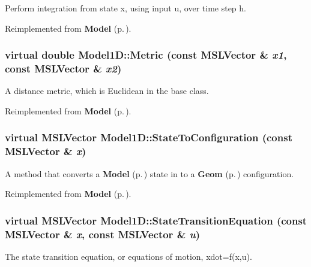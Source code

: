 Perform integration from state x, using input u, over time step h.



Reimplemented from {\bf Model} {\rm (p.\,\pageref{class_Model_a5})}.
\subsubsection{\setlength{\rightskip}{0pt plus 5cm}virtual double Model1D::Metric (const {\bf MSLVector} \& {\em x1}, const {\bf MSLVector} \& {\em x2})\hspace{0.3cm}{\tt  [virtual]}}\label{class_Model1D_a5}


A distance metric, which is Euclidean in the base class.



Reimplemented from {\bf Model} {\rm (p.\,\pageref{class_Model_a9})}.
\subsubsection{\setlength{\rightskip}{0pt plus 5cm}virtual {\bf MSLVector} Model1D::State\-To\-Configuration (const {\bf MSLVector} \& {\em x})\hspace{0.3cm}{\tt  [virtual]}}\label{class_Model1D_a2}


A method that converts a {\bf Model} {\rm (p.\,\pageref{class_Model})} state in to a {\bf Geom} {\rm (p.\,\pageref{class_Geom})} configuration.



Reimplemented from {\bf Model} {\rm (p.\,\pageref{class_Model_a8})}.
\subsubsection{\setlength{\rightskip}{0pt plus 5cm}virtual {\bf MSLVector} Model1D::State\-Transition\-Equation (const {\bf MSLVector} \& {\em x}, const {\bf MSLVector} \& {\em u})\hspace{0.3cm}{\tt  [virtual]}}\label{class_Model1D_a4}


The state transition equation, or equations of motion, xdot=f(x,u).



